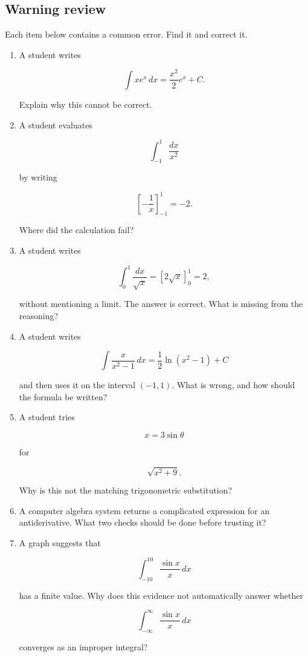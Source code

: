 \subsection{Warning review}
\label{subsec:chapter-11-warning-review}

Each item below contains a common error.  Find it and correct it.

\begin{enumerate}
\item A student writes

\[
\int x e^x\,dx
=
\frac{x^2}{2}e^x+C.
\]

Explain why this cannot be correct.

\item A student evaluates

\[
\int_{-1}^{1}\frac{dx}{x^2}
\]

by writing

\[
\left[-\frac1x\right]_{-1}^1=-2.
\]

Where did the calculation fail?

\item A student writes

\[
\int_0^1 \frac{dx}{\sqrt{x}}
=
\left[2\sqrt{x}\right]_0^1
=
2,
\]

without mentioning a limit.  The answer is correct.  What is missing from the reasoning?

\item A student writes

\[
\int \frac{x}{x^2-1}\,dx
=
\frac12\ln(x^2-1)+C
\]

and then uses it on the interval \((-1,1)\).  What is wrong, and how should the formula
be written?

\item A student tries

\[
x=3\sin\theta
\]

for

\[
\sqrt{x^2+9}.
\]

Why is this not the matching trigonometric substitution?

\item A computer algebra system returns a complicated expression for an antiderivative.
What two checks should be done before trusting it?

\item A graph suggests that

\[
\int_{-10}^{10} \frac{\sin x}{x}\,dx
\]

has a finite value.  Why does this evidence not automatically answer whether

\[
\int_{-\infty}^{\infty} \frac{\sin x}{x}\,dx
\]

converges as an improper integral?
\end{enumerate}

